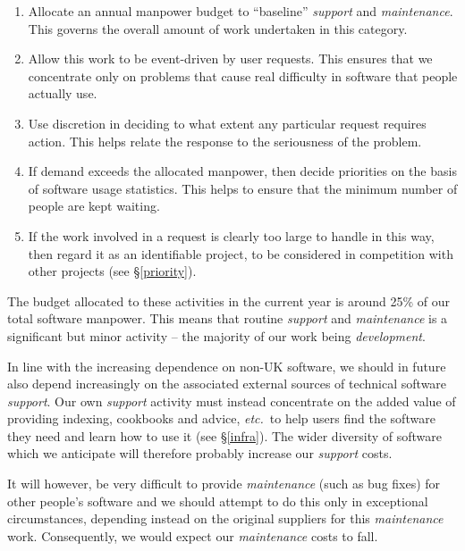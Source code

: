 \documentclass[twoside,11pt]{article}
\newcommand{\htmlref}[2]{#1}
\newcommand{\qt}[1]{``#1''}
\newcommand{\st}[1]{{\em{#1}}}
\newcommand{\qt}[1]{{\tt{"}}#1{\tt{"}}}
\newcommand{\dev}[1]{\htmlref{#1}{development}}
\begin{document}
\begin{enumerate}
\item Allocate an annual manpower budget to \qt{baseline} \st{support} and
\st{maintenance}. This governs the overall amount of work undertaken
in this category.

\item Allow this work to be event-driven by user requests. This
ensures that we concentrate only on problems that cause real
difficulty in software that people actually use.

\item Use discretion in deciding to what extent any particular request
requires action. This helps relate the response to the seriousness of
the problem.

\item If demand exceeds the allocated manpower, then decide priorities on
the basis of software usage statistics. This helps to ensure that the
minimum number of people are kept waiting.

\item If the work involved in a request is clearly too large to handle
in this way, then regard it as an identifiable project, to be
considered in competition with other projects (see \S\ref{priority}).

\end{enumerate}

The budget allocated to these activities in the current year is around
25\% of our total software manpower. This means that routine
\st{support} and \st{maintenance} is a significant but minor activity
-- the majority of our work being \st{\dev{development}}.

In line with the increasing dependence on non-UK software, we should in
future also depend increasingly on the associated external sources of
technical software \st{support}. Our own \st{support} activity must
instead concentrate on the added value of providing indexing,
cookbooks and advice, \st{etc.}\ to help users find the software they
need and learn how to use it (see \S\ref{infra}).  The wider diversity
of software which we anticipate will therefore probably increase our
\st{support} costs.

It will however, be very difficult to provide \st{maintenance} (such
as bug fixes) for other people's software and we should attempt to do
this only in exceptional circumstances, depending instead on the
original suppliers for this \st{maintenance} work. Consequently, we
would expect our \st{maintenance} costs to fall.
\end{document}
